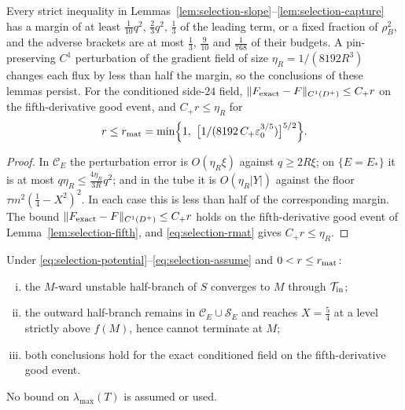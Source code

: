\begin{lemma}\label{lem:selection-robust}
Every strict inequality in Lemmas~\ref{lem:selection-slope}--\ref{lem:selection-capture} has a margin of at least $\frac1{10}q^2$, $\frac23q^2$, $\frac13$ of the leading term, or a fixed fraction of $\rho_B^2$, and the adverse brackets are at most $\frac13$, $\frac9{10}$ and $\frac1{768}$ of their budgets. A pin-preserving $C^1$ perturbation of the gradient field of size $\eta_R=1/(8192R^3)$ changes each flux by less than half the margin, so the conclusions of these lemmas persist. For the conditioned side-$24$ field, $\|F_{\rm exact}-F\|_{C^1(D^+)}\le C_+r$ on the fifth-derivative good event, and $C_+r\le\eta_R$ for
\begin{equation}\label{eq:selection-rmat}
r\le r_{\rm mat}=\min\Bigl\{1,\ \bigl[1/(8192\,C_+\varepsilon_0^{3/5})\bigr]^{5/2}\Bigr\}.
\end{equation}
\end{lemma}

\begin{proof}
In $\mathcal C_E$ the perturbation error is $O(\eta_R\xi)$ against $q\ge2R\xi$; on $\{E=E_*\}$ it is at most $q\eta_R\le\frac{4\eta_R}{3R}q^2$; and in the tube it is $O(\eta_R|Y|)$ against the floor $\tau m^2(\frac14-X^2)^2$. In each case this is less than half of the corresponding margin. The bound $\|F_{\rm exact}-F\|_{C^1(D^+)}\le C_+r$ holds on the fifth-derivative good event of Lemma~\ref{lem:selection-fifth}, and \eqref{eq:selection-rmat} gives $C_+r\le\eta_R$.
\end{proof}

\begin{theorem}\label{thm:selection-escape}
Under \eqref{eq:selection-potential}--\eqref{eq:selection-assume} and $0<r\le r_{\rm mat}$:
\begin{enumerate}[(i)]
\item the $M$-ward unstable half-branch of $S$ converges to $M$ through $\mathcal T_{\rm in}$;
\item the outward half-branch remains in $\mathcal C_E\cup\mathcal S_E$ and reaches $X=\frac54$ at a level strictly above $f(M)$, hence cannot terminate at $M$;
\item both conclusions hold for the exact conditioned field on the fifth-derivative good event.
\end{enumerate}
No bound on $\lambda_{\max}(T)$ is assumed or used.
\end{theorem}

